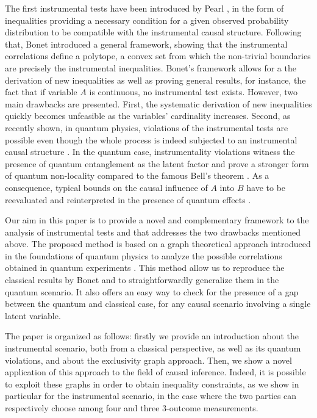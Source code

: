 \documentclass[letterpaper]{article}
\begin{document}
The first instrumental tests have been introduced by Pearl \cite{pearl1995}, in
the form of inequalities providing a necessary condition for a given observed
probability distribution to be compatible with the instrumental causal
structure. Following that, Bonet \cite{bonet2001} introduced a general
framework, showing that the instrumental correlations define a polytope, a
convex set from which the non-trivial boundaries are precisely the instrumental
inequalities. Bonet's framework allows for a the derivation of new inequalities
as well as proving general results, for instance, the fact that if variable $A$
is continuous, no instrumental test exists. However, two main drawbacks are
presented. First, the systematic derivation of new inequalities quickly becomes
unfeasible as the variables' cardinality increases. Second, as recently shown,
in quantum physics, violations of the instrumental tests are possible even
though the whole process is indeed subjected to an instrumental causal structure
\cite{chaves2018, himbeeck2018}. In the quantum case, instrumentality violations
witness the presence of quantum entanglement as the latent factor and prove a
stronger form of quantum non-locality compared to the famous Bell's theorem
\cite{chaves2018}. As a consequence, typical bounds on the causal influence of
$A$ into $B$ have to be reevaluated and reinterpreted in the presence of quantum
effects \cite{}.%

Our aim in this paper is to provide a novel and complementary framework to the
analysis of instrumental tests and that addresses the two drawbacks mentioned
above. The proposed method is based on a graph theoretical approach introduced
in the foundations of quantum physics to analyze the possible correlations
obtained in quantum experiments \cite{}. %
This method allow us to reproduce the classical results by Bonet and to
straightforwardly generalize them in the quantum scenario. 
It also offers an easy way to check for the presence of a gap between the
quantum and classical case, for any causal scenario involving a single latent
variable.

The paper is organized as follows: firstly we provide an introduction about the
instrumental scenario, both from a classical perspective, as well as its quantum
violations, and about the exclusivity graph approach. Then, we show a novel
application of this approach to the field of causal inference.
Indeed, it is possible to exploit these graphs in order to obtain inequality
constraints, as we show in particular for the instrumental scenario, in the case
where the two parties can respectively choose among four and three 3-outcome
measurements.
\end{document}
